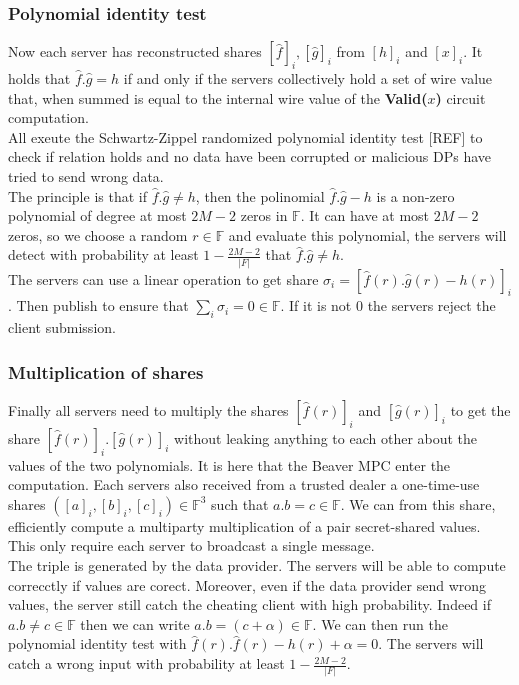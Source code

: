 \documentclass{article}
\begin{document}
\subsubsection{Polynomial identity test}
Now each server has reconstructed shares $[\hat{f}]_i, [\hat{g}]_i$ from $[h]_i$ and $[x]_i$. It holds that $ \hat{f}. \hat{g} = h$ if and only if the servers collectively hold a set of wire value that, when summed is equal to the internal wire value of the \textbf{Valid($x$)} circuit computation.\\
All exeute the Schwartz-Zippel randomized polynomial identity test [REF] to check if relation holds and no data have been corrupted or malicious DPs have tried to send wrong data.\\
The principle is that if $ \hat{f}. \hat{g} \neq h$, then the polinomial $ \hat{f}. \hat{g} - h$ is a non-zero polynomial of degree at most $2M-2$ zeros in $\mathbb{F}$. It can have at most $2M-2$ zeros, so we choose a random $r \in \mathbb{F}$ and evaluate this polynomial, the servers will detect with probability at least $1 - \frac{2M-2}{|F|}$ that $ \hat{f}. \hat{g} \neq h$.\\
The servers can use a linear operation to get share $\sigma_i = [ \hat{f}(r). \hat{g}(r) - h(r)]_i$. Then publish to ensure that $\sum_{i}{\sigma_i} = 0 \in \mathbb{F}$. If it is not $0$ the servers reject the client submission.
\subsubsection{Multiplication of shares}
Finally all servers need to multiply the shares $ [\hat{f}(r)]_i $ and $ [\hat{g}(r)]_i$ to get the share $[\hat{f}(r)]_i .[\hat{g}(r)]_i$ without leaking anything to each other about the values of the two polynomials. It is here that the Beaver MPC enter the computation. Each servers also received from a trusted dealer a one-time-use shares $([a]_i,[b]_i,[c]_i) \in \mathbb{F}^3 $ such that $a . b = c \in \mathbb{F}$. We can from this share, efficiently compute a multiparty multiplication of a pair secret-shared values. This only require each server to broadcast a single message.\\
The triple is generated by the data provider. The servers will be able to compute correcctly if values are corect. Moreover, even if the data provider send wrong values, the server still catch the cheating client with high probability. Indeed if $a.b \neq c \in \mathbb{F}$ then we can write $a.b = (c + \alpha) \in \mathbb{F}$. We can then run the polynomial identity test with $\hat{f}(r) . \hat{f}(r) - h(r) + \alpha = 0$. The servers will catch a wrong input with probability at least $1 - \frac{2M-2}{|F|}$.
\end{document}
